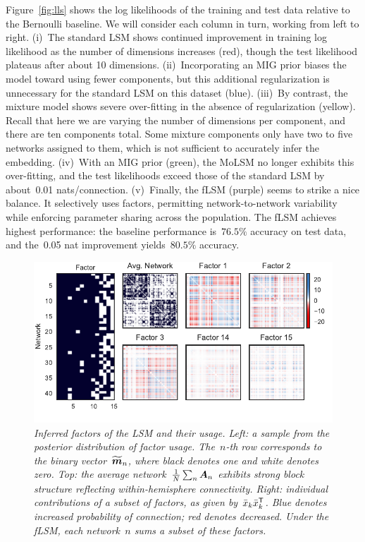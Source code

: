 Figure~\ref{fig:lls} shows the log likelihoods of the training and
test data relative to the Bernoulli baseline. We will consider each
column in turn, working from left to right.
(i)~The standard LSM shows continued
improvement in training log likelihood as the number of dimensions
increases (red), though the test likelihood plateaus after about 10
dimensions.
(ii)~Incorporating an MIG prior biases the model toward using
fewer components, but this  additional regularization is
unnecessary for the standard LSM on this dataset (blue).
(iii)~By contrast, the mixture model shows severe over-fitting in the absence of
regularization (yellow).  Recall that here we are varying the number
of dimensions per component, and there are ten components total.  Some
mixture components only have two to five networks assigned to them,
which is not sufficient to accurately infer the embedding.
(iv)~With an MIG prior (green), the MoLSM no longer exhibits this over-fitting,
and the test likelihoods exceed those of the standard LSM by about~0.01 nats/connection.
(v)~Finally, the fLSM (purple) seems to strike a nice balance.
It selectively uses factors, permitting network-to-network
variability while enforcing parameter sharing across the population.
The fLSM achieves highest performance: the baseline
performance is~$76.5\%$ accuracy on test data, and the~0.05 nat
improvement yields~$80.5\%$ accuracy.


\begin{figure}[t]
  \includegraphics[width=\linewidth]{figures/factors.pdf}
  \vspace{-.4in}
  \caption{\textit{Inferred factors of the LSM and their usage. Left:
      a sample from the posterior distribution of factor
      usage. The~$n$-th row corresponds to the binary
      vector~$\widetilde{\boldsymbol{m}}_n$, where black denotes one and white
      denotes zero. Top: the average
      network~${\tfrac{1}{N}\sum_n \boldsymbol{A}_n}$ exhibits strong block
      structure reflecting within-hemisphere connectivity.  Right:
      individual contributions of a subset of factors, as given
      by~$\bar{x}_k \bar{x}_k^{\mathsf{T}}$.  Blue denotes increased
      probability of connection; red denotes decreased. Under the
      fLSM, each network~$n$ sums a subset of these factors. }}
\label{fig:factors}
\end{figure}

